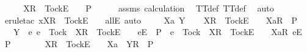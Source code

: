 \begin{isabellebody}
\ \ \isamarkupfalse%
\ \isamarkupfalse%
\ {\isachardoublequoteopen}{\isacharbrackleft}X{\isacharbrackright}\isactrlsub R\ {\isacharhash}\ {\isacharbrackleft}Tock{\isacharbrackright}\isactrlsub E\ {\isacharhash}\ {\isasymrho}\ {\isasymin}\ P{\isachardoublequoteclose}\isanewline
\ \ \ \ \isamarkupfalse%
\ assms{\isacharparenleft}{}{\isacharparenright}\ calculation\ \isamarkupfalse%
\ TT{\isacharunderscore}def\ TT{}{\isacharunderscore}def\ \isamarkupfalse%
\ auto\ \isanewline
\ \ \ \ \isamarkupfalse%
\ {\isacharparenleft}erule{\isacharunderscore}tac\ x{\isacharequal}{\isachardoublequoteopen}{\isacharbrackleft}X{\isacharbrackright}\isactrlsub R\ {\isacharhash}\ {\isacharbrackleft}Tock{\isacharbrackright}\isactrlsub E\ {\isacharhash}\ {\isasymrho}{\isachardoublequoteclose}\ \ allE{\isacharcomma}\ auto{\isacharparenright}\isanewline
{}\isamarkupfalse%
\isanewline
\ \ \isamarkupfalse%
\ {\isasymrho}\ Xa\ Y\isanewline
\ \ \isamarkupfalse%
\ {\isachardoublequoteopen}{\isacharbrackleft}X{\isacharbrackright}\isactrlsub R\ {\isacharhash}\ {\isacharbrackleft}Tock{\isacharbrackright}\isactrlsub E\ {\isacharhash}\ {\isasymrho}\ {\isacharat}\ {\isacharbrackleft}{\isacharbrackleft}Xa{\isacharbrackright}\isactrlsub R{\isacharbrackright}\ {\isasymin}\ P{\isachardoublequoteclose}\isanewline
\ \ \ {\isachardoublequoteopen}Y\ {\isasyminter}\ {\isacharbraceleft}e{\isachardot}\ e\ {\isasymnoteq}\ Tock\ {\isasymand}\ {\isacharbrackleft}X{\isacharbrackright}\isactrlsub R\ {\isacharhash}\ {\isacharbrackleft}Tock{\isacharbrackright}\isactrlsub E\ {\isacharhash}\ {\isasymrho}\ {\isacharat}\ {\isacharbrackleft}{\isacharbrackleft}e{\isacharbrackright}\isactrlsub E{\isacharbrackright}\ {\isasymin}\ P\ {\isasymor}\ e\ {\isacharequal}\ Tock\ {\isasymand}\ {\isacharbrackleft}X{\isacharbrackright}\isactrlsub R\ {\isacharhash}\ {\isacharbrackleft}Tock{\isacharbrackright}\isactrlsub E\ {\isacharhash}\ {\isasymrho}\ {\isacharat}\ {\isacharbrackleft}{\isacharbrackleft}Xa{\isacharbrackright}\isactrlsub R{\isacharcomma}\ {\isacharbrackleft}e{\isacharbrackright}\isactrlsub E{\isacharbrackright}\ {\isasymin}\ P{\isacharbraceright}\ {\isacharequal}\ {\isacharbraceleft}{\isacharbraceright}{\isachardoublequoteclose}\isanewline
\ \ \isamarkupfalse%
\ \isamarkupfalse%
\ {\isachardoublequoteopen}{\isacharbrackleft}X{\isacharbrackright}\isactrlsub R\ {\isacharhash}\ {\isacharbrackleft}Tock{\isacharbrackright}\isactrlsub E\ {\isacharhash}\ {\isasymrho}\ {\isacharat}\ {\isacharbrackleft}{\isacharbrackleft}Xa\ {\isasymunion}\ Y{\isacharbrackright}\isactrlsub R{\isacharbrackright}\ {\isasymin}\ P{\isachardoublequoteclose}\isanewline

\end{isabellebody}
